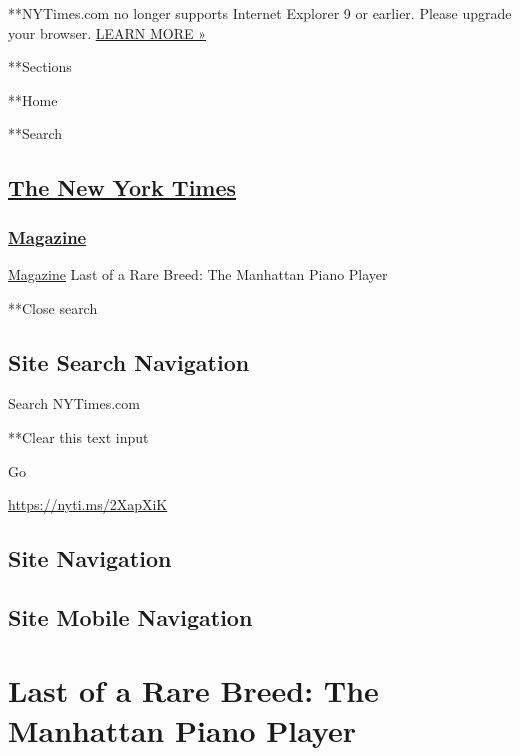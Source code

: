  **NYTimes.com no longer supports Internet Explorer 9 or earlier. Please
upgrade your browser.
\href{http://www.nytimes3xbfgragh.onion/content/help/site/ie9-support.html}{LEARN
MORE »}

**Sections

**Home

**Search

\hypertarget{the-new-york-times}{%
\subsection{\texorpdfstring{\href{http://www.nytimes3xbfgragh.onion/}{The
New York Times}}{The New York Times}}\label{the-new-york-times}}

\hypertarget{-magazine-}{%
\subsubsection{\texorpdfstring{
\href{https://www.nytimes3xbfgragh.onion/section/magazine}{Magazine}
}{ Magazine }}\label{-magazine-}}

 \href{https://www.nytimes3xbfgragh.onion/section/magazine}{Magazine}
\textbar{}Last of a Rare Breed: The Manhattan Piano Player

**Close search

\hypertarget{site-search-navigation}{%
\subsection{Site Search Navigation}\label{site-search-navigation}}

Search NYTimes.com

**Clear this text input

Go

\url{https://nyti.ms/2XapXiK}

\hypertarget{site-navigation}{%
\subsection{Site Navigation}\label{site-navigation}}

\hypertarget{site-mobile-navigation}{%
\subsection{Site Mobile Navigation}\label{site-mobile-navigation}}

\hypertarget{last-of-a-rare-breed-the-manhattan-piano-player}{%
\section{Last of a Rare Breed: The Manhattan Piano
Player}\label{last-of-a-rare-breed-the-manhattan-piano-player}}

